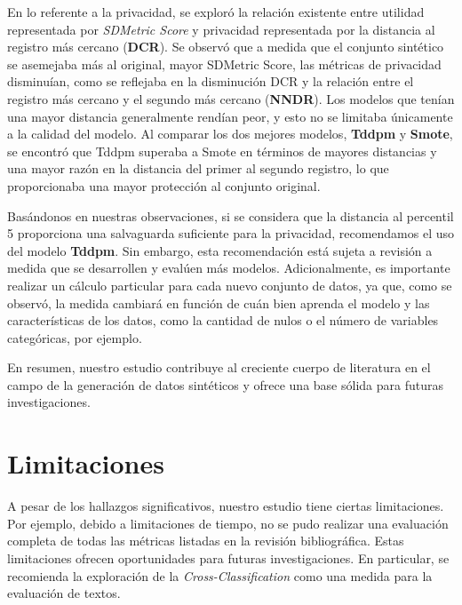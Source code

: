 En lo referente a la privacidad, se exploró la relación existente entre utilidad representada por \emph{SDMetric Score} y privacidad representada por la distancia al registro más cercano (\textbf{DCR}). Se observó que a medida que el conjunto sintético se asemejaba más al original, mayor SDMetric Score, las métricas de privacidad disminuían, como se reflejaba en la disminución DCR y la relación entre el registro más cercano y el segundo más cercano (\textbf{NNDR}). Los modelos que tenían una mayor distancia generalmente rendían peor, y esto no se limitaba únicamente a la calidad del modelo. Al comparar los dos mejores modelos, \textbf{Tddpm} y \textbf{Smote}, se encontró que Tddpm superaba a Smote en términos de mayores distancias y una mayor razón en la distancia del primer al segundo registro, lo que proporcionaba una mayor protección al conjunto original.

Basándonos en nuestras observaciones, si se considera que la distancia al percentil 5 proporciona una salvaguarda suficiente para la privacidad, recomendamos el uso del modelo \textbf{Tddpm}. Sin embargo, esta recomendación está sujeta a revisión a medida que se desarrollen y evalúen más modelos. Adicionalmente, es importante realizar un cálculo particular para cada nuevo conjunto de datos, ya que, como se observó, la medida cambiará en función de cuán bien aprenda el modelo y las características de los datos, como la cantidad de nulos o el número de variables categóricas, por ejemplo.

En resumen, nuestro estudio contribuye al creciente cuerpo de literatura en el campo de la generación de datos sintéticos y ofrece una base sólida para futuras investigaciones.


\section{Limitaciones}
\label{sec:limit}
A pesar de los hallazgos significativos, nuestro estudio tiene ciertas limitaciones. Por ejemplo, debido a limitaciones de tiempo, no se pudo realizar una evaluación completa de todas las métricas listadas en la revisión bibliográfica. Estas limitaciones ofrecen oportunidades para futuras investigaciones. En particular, se recomienda la exploración de la \emph{Cross-Classification} como una medida para la evaluación de textos.

